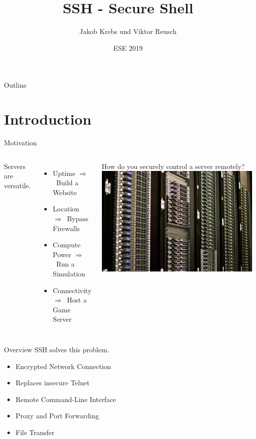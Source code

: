 \documentclass[10pt,graphics,aspectratio=169,table]{beamer}
\title{SSH - Secure Shell}
\author{Jakob Krebs und Viktor Reusch}
\date{ESE 2019}
\institute{NERD101 - ESE - ifsr - TU Dresden}
\newcommand{\ra}{$\Rightarrow$\ }
\begin{document}
\maketitle
\begin{frame}{Outline}
	\tableofcontents
\end{frame}

\section{Introduction}
\begin{frame}{Motivation}
\begin{columns}
	Servers are versatile.
	\begin{itemize}
		\item Uptime \ra Build a Website
		\item Location \ra Bypass Firewalls
		\item Compute Power \ra Run a Simulation
		\item Connectivity \ra Host a Game Server
	\end{itemize}
	How do you securely control a server remotely?
	\includegraphics[width=\textwidth]{img/servers.jpg} \cite{servers}
\end{columns}
\end{frame}

\begin{frame}{Overview}
	SSH solves this problem.
	\begin{itemize}
		\item Encrypted Network Connection
		\item Replaces insecure Telnet
		\item Remote Command-Line Interface
		\item Proxy and Port Forwarding
		\item File Transfer
	\end{itemize}
\end{frame}
\end{document}
